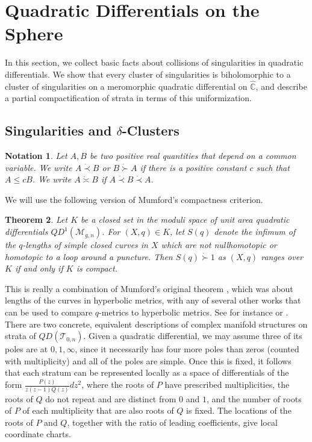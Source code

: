 \documentclass[12pt]{article}
\newtheorem{theorem}{Theorem}[section]
\newtheorem{notation}[theorem]{Notation}
\newcommand{\cc}{\mathbb{C}}
\begin{document}
\section{Quadratic Differentials on the Sphere}

\noindent In this section, we collect basic facts about collisions of singularities in quadratic differentials. We show that every cluster of singularities is biholomorphic to a cluster of singularities on a meromorphic quadratic differential on $\hat{\cc}$, and describe a partial compactification of strata in terms of this uniformization.

\subsection{Singularities and $\delta$-Clusters}

\begin{notation}
Let $A,B$ be two positive real quantities that depend on a common variable. We write $A \dot{\prec} B$ or $B \dot{\succ} A$ if there is a positive constant $c$ such that $A \leq cB$. We write $A \dot{\asymp} B$ if $A \dot{\prec} B \dot{\prec} A$.
\end{notation}

\noindent We will use the following version of Mumford's compactness criterion.

\begin{theorem}Let $K$ be a closed set in the moduli space of unit area quadratic differentials $QD^1(\mathcal{M}_{g,n})$. For $(X,q) \in K$, let $S(q)$ denote the infimum of the $q$-lengths of simple closed curves in $X$ which are not nullhomotopic or homotopic to a loop around a puncture. Then $S(q) \dot{\succ} 1$ as $(X,q)$ ranges over $K$ if and only if $K$ is compact.\end{theorem}

\noindent This is really a combination of Mumford's original theorem \cite{Mumf}, which was about lengths of the curves in hyperbolic metrics, with any of several other works that can be used to compare $q$-metrics to hyperbolic metrics. See for instance \cite{ThickThin} or \cite{Maskit}.\\

\noindent There are two concrete, equivalent descriptions of complex manifold structures on strata of $QD(\mathcal{T}_{0,n})$. Given a quadratic differential, we may assume three of its poles are at $0,1,\infty$, since it necessarily has four more poles than zeros (counted with multiplicity) and all of the poles are simple. Once this is fixed, it follows that each stratum can be represented locally as a space of differentials of the form $\frac{P(z)}{z(z-1)Q(z)}dz^2$, where the roots of $P$ have prescribed multiplicities, the roots of $Q$ do not repeat and are distinct from $0$ and $1$, and the number of roots of $P$ of each multiplicity that are also roots of $Q$ is fixed. The locations of the roots of $P$ and $Q$, together with the ratio of leading coefficients, give local coordinate charts.\\
\end{document}
